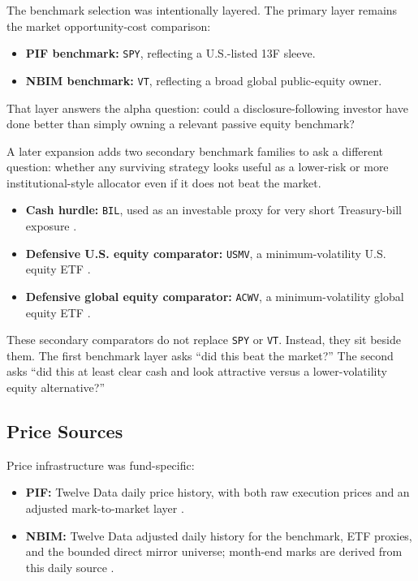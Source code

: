 \documentclass[conference]{IEEEtran}
\begin{document}
The benchmark selection was intentionally layered. The primary layer remains the market opportunity-cost comparison:
\begin{itemize}[leftmargin=1.4em]
    \item \textbf{PIF benchmark:} \texttt{SPY}, reflecting a U.S.-listed 13F sleeve.
    \item \textbf{NBIM benchmark:} \texttt{VT}, reflecting a broad global public-equity owner.
\end{itemize}

That layer answers the alpha question: could a disclosure-following investor have done better than simply owning a relevant passive equity benchmark?

A later expansion adds two secondary benchmark families to ask a different question: whether any surviving strategy looks useful as a lower-risk or more institutional-style allocator even if it does not beat the market.
\begin{itemize}[leftmargin=1.4em]
    \item \textbf{Cash hurdle:} \texttt{BIL}, used as an investable proxy for very short Treasury-bill exposure \cite{bil}.
    \item \textbf{Defensive U.S. equity comparator:} \texttt{USMV}, a minimum-volatility U.S. equity ETF \cite{usmv}.
    \item \textbf{Defensive global equity comparator:} \texttt{ACWV}, a minimum-volatility global equity ETF \cite{acwv}.
\end{itemize}

These secondary comparators do not replace \texttt{SPY} or \texttt{VT}. Instead, they sit beside them. The first benchmark layer asks ``did this beat the market?'' The second asks ``did this at least clear cash and look attractive versus a lower-volatility equity alternative?''

\subsection{Price Sources}

Price infrastructure was fund-specific:
\begin{itemize}[leftmargin=1.4em]
    \item \textbf{PIF:} Twelve Data daily price history, with both raw execution prices and an adjusted mark-to-market layer \cite{twelvedata}.
    \item \textbf{NBIM:} Twelve Data adjusted daily history for the benchmark, ETF proxies, and the bounded direct mirror universe; month-end marks are derived from this daily source \cite{twelvedata}.
\end{itemize}
\end{document}

